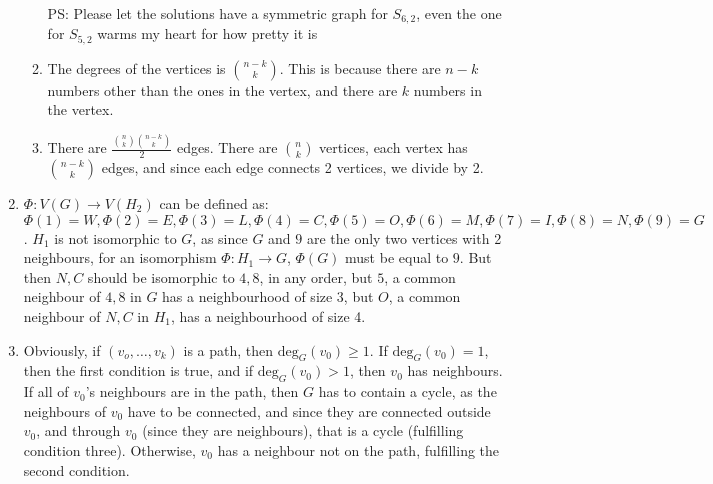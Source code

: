 \documentclass[10pt,english]{article}
\begin{document}
\begin{enumerate}
\begin{enumerate}
 \\ PS: Please let the solutions have a symmetric graph for $S_{6,2}$, even the one for $S_{5,2}$ warms my heart for how pretty it is
    \item The degrees of the vertices is ${n-k\choose k}$. This is because there are $n-k$ numbers other than the ones in the vertex, and there are $k$ numbers in the vertex. 
    \item There are $\frac{{n\choose k}{n-k\choose k}}{2}$ edges. There are ${n\choose k}$ vertices, each vertex has ${n-k\choose k}$ edges, and since each edge connects 2 vertices, we divide by 2. 
\end{enumerate}

\pagebreak
\item $\Phi:V(G)\rightarrow V(H_2)$ can be defined as: $\Phi(1)=W,\Phi(2)=E,\Phi(3)=L,\Phi(4)=C,\Phi(5)=O,\Phi(6)=M,\Phi(7)=I,\Phi(8)=N,\Phi(9)=G$. $H_1$ is not isomorphic to $G$, as since $G$ and $9$ are the only two vertices with 2 neighbours, for an isomorphism $\Phi:H_1\rightarrow G$, $\Phi(G)$ must be equal to $9$. But then $N,C$ should be isomorphic to $4,8$, in any order, but $5$, a common neighbour of $4,8$ in $G$ has a neighbourhood of size 3, but $O$, a common neighbour of $N,C$ in $H_1$, has a neighbourhood of size 4. 

\pagebreak
\item Obviously, if $(v_o,\ldots,v_k)$ is a path, then $\text{deg}_G(v_0)\geq1$. If $\text{deg}_G(v_0)=1$, then the first condition is true, and if $\text{deg}_G(v_0)>1$, then  $v_0$ has neighbours. If all of $v_0$'s neighbours are in the path, then $G$ has to contain a cycle, as the neighbours of $v_0$ have to be connected, and since they are connected outside $v_0$, and through $v_0$ (since they are neighbours), that is a cycle (fulfilling condition three). Otherwise, $v_0$ has a neighbour not on the path, fulfilling the second condition. 
\end{enumerate}
\end{document}
